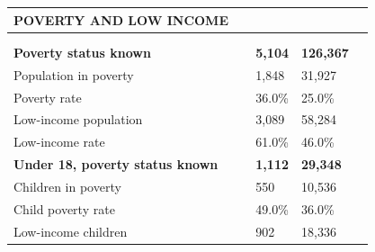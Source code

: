 \documentclass[9pt]{report}
\begin{document}
\vspace{12pt}
\setlength{\tabcolsep}{.01in} %
\begin{tabular}{p{.10in}p{.10in}p{.10in}p{3.7in}>{\hfill}p{.85in}>{\hfill}p{.85in}>{\hfill}p{.85in}>{\hfill}p{.85in}p{0.1in}}
\multicolumn{9}{l}{\parbox{7.1in}{\raggedright{\large{\strut\textbf{POVERTY AND LOW INCOME}\strut}}}} \\ 
\hline
\multicolumn{4}{l}{\parbox{3.5in}{\raggedright{\textbf{}}}} & \multicolumn{1}{r}{\parbox{.85in}{\strut\raggedleft{\textbf{}\strut}}} & \multicolumn{1}{r}{\parbox{.85in}{\strut\raggedleft{\textbf{}\strut}}} & \multicolumn{1}{r}{\parbox{.85in}{\strut{}}} & \multicolumn{1}{r}{\parbox{.85in}{\strut{}}} & \\ 
\multicolumn{9}{l}{} \\ 
\multicolumn{4}{l}{\parbox{3.5in}{\strut\raggedright{\textbf{Poverty status known}\strut}}} & \textbf{} & \textbf{} & \textbf{5,104} & \textbf{126,367} & \textbf{} \\ 
\multicolumn{4}{l}{\parbox{3.6in}{\strut\raggedright{{Population in poverty}}\strut}} &  &  & 1,848 & 31,927 & \multicolumn{1}{l}{}  \\ 
\multicolumn{4}{l}{\parbox{3.6in}{\strut\raggedright{{Poverty rate}}\strut}} &  &  & 36.0\% & 25.0\% & \multicolumn{1}{l}{}  \\ 
\multicolumn{4}{l}{\parbox{3.6in}{\strut\raggedright{{Low-income population}}\strut}} &  &  & 3,089 & 58,284 & \multicolumn{1}{l}{}  \\ 
\multicolumn{4}{l}{\parbox{3.6in}{\strut\raggedright{{Low-income rate}}\strut}} &  &  & 61.0\% & 46.0\% & \multicolumn{1}{l}{}  \\ 
\multicolumn{4}{l}{\parbox{3.5in}{\strut\raggedright{\textbf{Under 18, poverty status known}\strut}}} & \textbf{} & \textbf{} & \textbf{1,112} & \textbf{29,348} & \textbf{} \\ 
\multicolumn{4}{l}{\parbox{3.6in}{\strut\raggedright{{Children in poverty}}\strut}} &  &  & 550 & 10,536 & \multicolumn{1}{l}{}  \\ 
\multicolumn{4}{l}{\parbox{3.6in}{\strut\raggedright{{Child poverty rate}}\strut}} &  &  & 49.0\% & 36.0\% & \multicolumn{1}{l}{}  \\ 
\multicolumn{4}{l}{\parbox{3.6in}{\strut\raggedright{{Low-income children}}\strut}} &  &  & 902 & 18,336 & \multicolumn{1}{l}{}  \\ 

\end{tabular}
\end{document}
